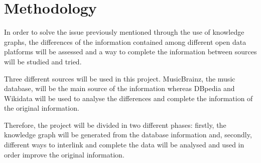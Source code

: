 \section{Methodology}
In order to solve the issue previously mentioned through the use of knowledge graphs, the differences of the information contained among different open data platforms will be assessed and a way to complete the information between sources will be studied and tried.  

Three different sources will be used in this project. MusicBrainz, the music database, will be the main source of the information whereas DBpedia and Wikidata will be used to analyse the differences and complete the information of the original information.  

Therefore, the project will be divided in two different phases: firstly, the knowledge graph will be generated from the database information and, secondly, different ways to interlink and complete the data will be analysed and used in order improve the original information. 